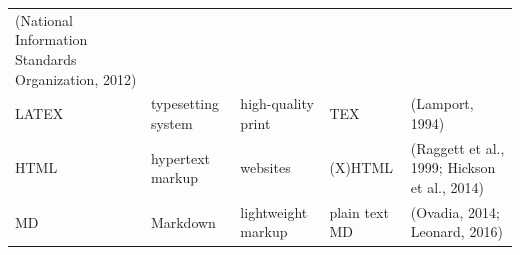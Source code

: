 \documentclass[10pt,fleqn]{wlpeerj}
\begin{document}
\begin{longtable}[c]{@{}lllll@{}}
\begin{minipage}[t]{0.40\columnwidth}
(National Information Standards Organization, 2012)
\strut\end{minipage}\tabularnewline
\begin{minipage}[t]{0.06\columnwidth}\raggedright\strut
LATEX
\strut\end{minipage} &
\begin{minipage}[t]{0.18\columnwidth}\raggedright\strut
typesetting system
\strut\end{minipage} &
\begin{minipage}[t]{0.13\columnwidth}\raggedright\strut
high-quality print
\strut\end{minipage} &
\begin{minipage}[t]{0.09\columnwidth}\raggedright\strut
TEX
\strut\end{minipage} &
\begin{minipage}[t]{0.40\columnwidth}\raggedright\strut
(Lamport, 1994)
\strut\end{minipage}\tabularnewline
\begin{minipage}[t]{0.06\columnwidth}\raggedright\strut
HTML
\strut\end{minipage} &
\begin{minipage}[t]{0.18\columnwidth}\raggedright\strut
hypertext markup
\strut\end{minipage} &
\begin{minipage}[t]{0.13\columnwidth}\raggedright\strut
websites
\strut\end{minipage} &
\begin{minipage}[t]{0.09\columnwidth}\raggedright\strut
(X)HTML
\strut\end{minipage} &
\begin{minipage}[t]{0.40\columnwidth}\raggedright\strut
(Raggett et al., 1999; Hickson et al., 2014)
\strut\end{minipage}\tabularnewline
\begin{minipage}[t]{0.06\columnwidth}\raggedright\strut
MD
\strut\end{minipage} &
\begin{minipage}[t]{0.18\columnwidth}\raggedright\strut
Markdown
\strut\end{minipage} &
\begin{minipage}[t]{0.13\columnwidth}\raggedright\strut
lightweight markup
\strut\end{minipage} &
\begin{minipage}[t]{0.09\columnwidth}\raggedright\strut
plain text MD
\strut\end{minipage} &
\begin{minipage}[t]{0.40\columnwidth}\raggedright\strut
(Ovadia, 2014; Leonard, 2016)
\strut\end{minipage}\tabularnewline
\bottomrule
\end{longtable}
\end{document}
